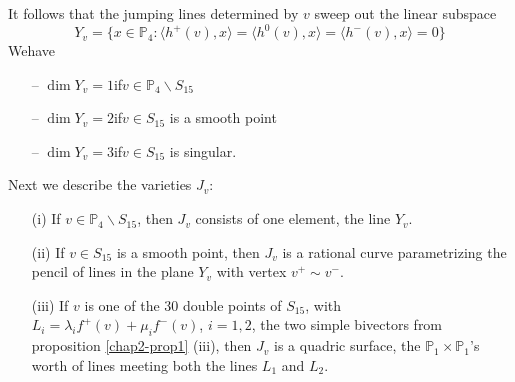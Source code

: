 It follows that the jumping lines determined by $v$ sweep out the
linear subspace
$$
Y_{v}=\{x\in \mathbb{P}_{4}:\langle h^{+}(v),x\rangle=\langle
h^{0}(v),x\rangle =\langle h^{-}(v),x\rangle=0\}
$$
We\pageoriginale have
\begin{itemize}
\item[--] $\dim Y_{v}=1$\qquad if\qquad $v\in \mathbb{P}_{4}\backslash
S_{15}$

\item[--] $\dim Y_{v}=2$\qquad if\qquad $v\in S_{15}$ is a smooth
point

\item[--] $\dim Y_{v}=3$\qquad if\qquad $v\in S_{15}$ is singular.
\end{itemize}
Next we describe the varieties $J_{v}$:

\begin{proposition}\label{chap2-prop12}
\begin{itemize}
\item[\rm(i)] If $v\in \mathbb{P}_{4}\backslash S_{15}$, then $J_{v}$
consists of one element, the line $Y_{v}$.

\item[\rm(ii)] If $v\in S_{15}$ is a smooth point, then $J_{v}$ is a
rational curve parametrizing the pencil of lines in the plane $Y_{v}$
with vertex $v^{+}\sim v^{-}$. 

\item[\rm(iii)] If $v$ is one of the $30$ double points of $S_{15}$,
with $L_{i}=\lambda_{i}f^{+}(v)+\mu_{i}f^{-}(v)$, $i=1,2$, the two
simple bivectors from proposition \ref{chap2-prop1} {\rm (iii)}, then
$J_{v}$ is a quadric surface, the
$\mathbb{P}_{1}\times \mathbb{P}_{1}$'s worth of lines meeting both
the lines $L_{1}$ and $L_{2}$.
\end{itemize}
\end{proposition}

